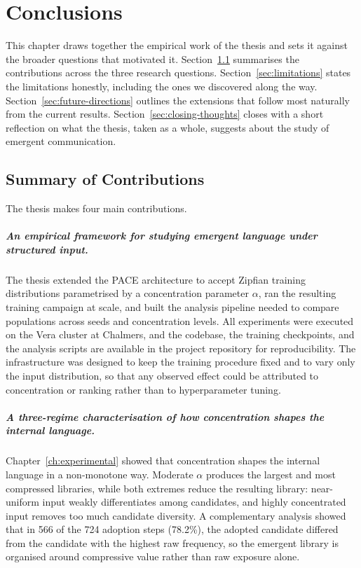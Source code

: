 \chapter{Conclusions}
\label{ch:conclusion}

This chapter draws together the empirical work of the thesis and sets it against the broader questions that motivated it. Section~\ref{sec:contribution-summary} summarises the contributions across the three research questions. Section~\ref{sec:limitations} states the limitations honestly, including the ones we discovered along the way. Section~\ref{sec:future-directions} outlines the extensions that follow most naturally from the current results. Section~\ref{sec:closing-thoughts} closes with a short reflection on what the thesis, taken as a whole, suggests about the study of emergent communication.

\section{Summary of Contributions}
\label{sec:contribution-summary}

The thesis makes four main contributions.

\paragraph{An empirical framework for studying emergent language under structured input.}
The thesis extended the PACE architecture to accept Zipfian training distributions parametrised by a concentration parameter $\alpha$, ran the resulting training campaign at scale, and built the analysis pipeline needed to compare populations across seeds and concentration levels. All experiments were executed on the Vera cluster at Chalmers, and the codebase, the training checkpoints, and the analysis scripts are available in the project repository for reproducibility. The infrastructure was designed to keep the training procedure fixed and to vary only the input distribution, so that any observed effect could be attributed to concentration or ranking rather than to hyperparameter tuning.

\paragraph{A three-regime characterisation of how concentration shapes the internal language.}
Chapter~\ref{ch:experimental} showed that concentration shapes the internal language in a non-monotone way. Moderate $\alpha$ produces the largest and most compressed libraries, while both extremes reduce the resulting library: near-uniform input weakly differentiates among candidates, and highly concentrated input removes too much candidate diversity. A complementary analysis showed that in 566 of the 724 adoption steps (78.2\%), the adopted candidate differed from the candidate with the highest raw frequency, so the emergent library is organised around compressive value rather than raw exposure alone.

